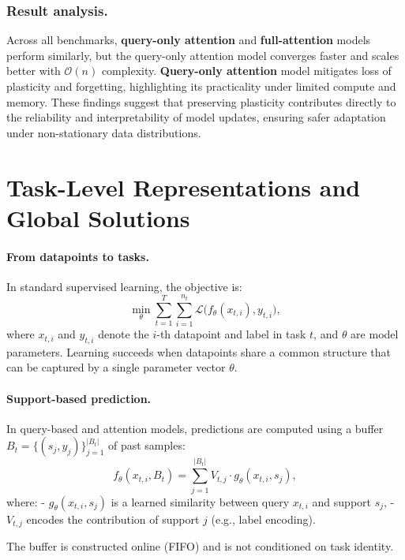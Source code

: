 \documentclass{article}
\begin{document}
\normalfont
\raggedright
\subsubsection{Result analysis.}
Across all benchmarks, \textbf{query-only attention} and \textbf{full-attention} models perform similarly, but the query-only attention model converges faster and scales better with $\mathcal{O}(n)$ complexity. 
\textbf{Query-only attention} model mitigates loss of plasticity and forgetting, highlighting its practicality under limited compute and memory.
These findings suggest that preserving plasticity contributes directly to the reliability and interpretability of model updates, ensuring safer adaptation under non-stationary data distributions.


\section{Task-Level Representations and Global Solutions}
\label{sec:theory}

\paragraph{From datapoints to tasks.}
In standard supervised learning, the objective is:
\begin{equation}
\min_{\theta} \sum_{t=1}^{T} \sum_{i=1}^{n_t} 
\mathcal{L}\big(f_\theta(x_{t,i}), y_{t,i}\big),
\end{equation}
where $x_{t,i}$ and $y_{t,i}$ denote the $i$-th datapoint and label in task $t$, and $\theta$ are model parameters. 
Learning succeeds when datapoints share a common structure that can be captured by a single parameter vector $\theta$.

\paragraph{Support-based prediction.}
In query-based and attention models, predictions are computed using a buffer 
$B_t = \{(s_j, y_j)\}_{j=1}^{|B_t|}$ of past samples:
\begin{equation}
f_\theta(x_{t,i}, B_t) = \sum_{j=1}^{|B_t|} V_{t,j} \cdot g_\theta(x_{t,i}, s_j),
\end{equation}
where:
- $g_\theta(x_{t,i}, s_j)$ is a learned similarity between query $x_{t,i}$ and support $s_j$,
- $V_{t,j}$ encodes the contribution of support $j$ (e.g., label encoding).

The buffer is constructed online (FIFO) and is not conditioned on task identity.
\end{document}
